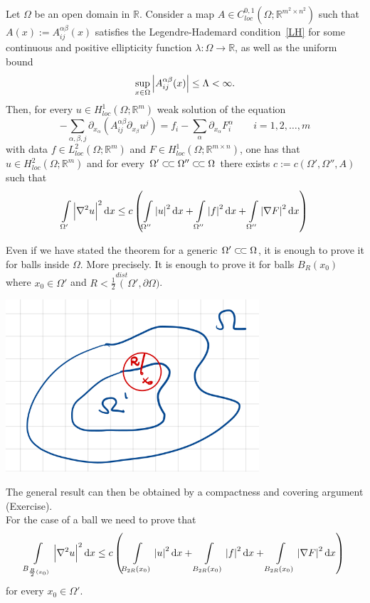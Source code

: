 \begin{thm}[\(H^{2}\)-regularity]
	Let \( \Omega  \) be an open domain in \( \mathbb{R} \). Consider a map \( A\in C_{loc}^{0,1}(\Omega ; \mathbb{R}^{m^{2}\times n^{2}})  \)
	such that \( A(x) := A_{ij}^{\alpha \beta }(x)\) satisfies the Legendre-Hademard condition~\eqref{LH} for some continuous and positive ellipticity function \( \lambda : \Omega \to \mathbb{R}\),
	as well as the uniform bound
	\[ \sup_{x \in \Omega } \abs{A_{ij}^{\alpha \beta }(x)}\leq \Lambda < \infty. \] Then,
	for every \( u \in H_{loc}^{1}(\Omega ; \mathbb{R}^{m})  \) weak solution of the equation \[ - \sum\limits_{\alpha ,\beta ,j}^{}\partial_{x_{\alpha }}(A_{ij}^{\alpha \beta }\partial_{x_{\beta}}u^{j}) = f_{i}-\sum\limits_{\alpha}^{} \partial_{x_{\alpha }}F_{i}^{\alpha } \qquad i=1,2,\ldots,m  \]
	with data \( f \in L_{loc}^{2}(\Omega ;\mathbb{R}^{m}) \) and \( F \in H_{loc}^{1}(\Omega ;\mathbb{R}^{m \times n})  \), one  has that \( u \in H_{loc}^{2}(\Omega ; \mathbb{R}^{m})  \) and for every \( \Omega' \ssubset \Omega'' \ssubset \Omega \) there exists \( c:=c(\Omega', \Omega'', A)  \) such that
	\[ \int\limits_{\Omega'}^{} \abs{\nabla ^{2}u}^{2} \dd{x} \leq c \left( \int\limits_{\Omega''}^{} \abs{u}^{2} \dd{x} + \int\limits_{\Omega''}^{} \abs{f}^{2} \dd{x} + \int\limits_{\Omega''}^{} \abs{\nabla F}^{2} \dd{x} \right) \]
\end{thm}

\begin{remark}[]
	Even if we have stated the theorem for a generic \( \Omega' \ssubset \Omega  \), it is enough to prove it for balls inside \( \Omega  \).
	More precisely. It is enough to prove it for balls \( B_{R}(x_{0}) \) where \( x_{0}\in \Omega' \) and \( R < \frac{1}{2}\overset{dist}(\Omega', \partial \Omega )  \).
	\begin{center}
		\includegraphics[scale=0.45]{pictures/picture02.png}
	\end{center}
	The general result can then be obtained by a compactness and covering argument (Exercise).\\
	For the case of a ball we need to prove that
	\[ \int\limits_{B_{\frac{R}{2}(x_{0}) }}^{} \abs{\nabla ^{2}u}^{2} \dd{x} \leq c \left( \int\limits_{B_{2R}(x_{0})}^{} \abs{u}^{2} \dd{x} + \int\limits_{B_{2R}(x_{0})}^{} \abs{f}^{2} \dd{x} + \int\limits_{B_{2R}(x_{0})}^{} \abs{\nabla F}^{2} \dd{x} \right) \] for every \( x_{0} \in \Omega' \).
\end{remark}

